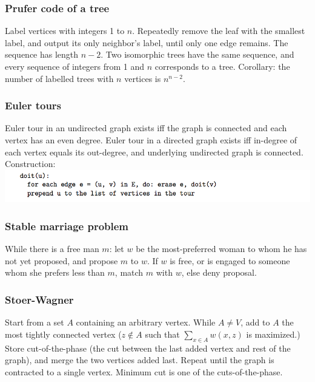 \documentclass[a4paper,12pt]{article}
\begin{document}
\subsubsection{Prufer code of a tree}
Label vertices with integers 1 to $n$. Repeatedly remove the leaf with the smallest label, and output its only neighbor’s label, until only one edge remains. The sequence has length $n - 2$.
Two isomorphic trees have the same sequence, and every sequence of integers from 1 and $n$ corresponds to a tree. Corollary: the number of labelled trees with $n$ vertices is $n^{n-2}$.

\subsubsection{Euler tours}
Euler tour in an undirected graph exists iff the graph is connected and each vertex has an even degree. Euler tour in a directed graph exists iff in-degree of each vertex equals its out-degree, and underlying undirected graph is connected.
Construction:\\
\includegraphics[scale=.7]{graph/euler}

\newpage
\subsubsection{Stable marriage problem}
While there is a free man $m$: let $w$ be the most-preferred woman to whom he has not yet proposed, and propose $m$ to $w$. If $w$ is free, or is engaged to someone whom she prefers less than $m$, match $m$ with $w$, else deny proposal.
\begin{multicols}{2}
  
\end{multicols}

\newpage
\subsubsection{Stoer-Wagner}
Start from a set $A$ containing an arbitrary vertex. While $A \neq V$, add to $A$ the most tightly connected vertex ($z \not\in A$ such that $\sum_{x\in A}w(x,z)$ is maximized.)
Store cut-of-the-phase (the cut between the last added vertex and rest of the graph), and merge the two vertices added last. Repeat until the graph is contracted to a single vertex. Minimum cut is one of the cuts-of-the-phase.
\begin{multicols}{2}
  
\end{multicols}
\end{document}

